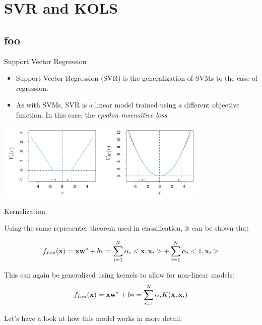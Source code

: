 \documentclass[serif,xcolor=pdftex,dvipsnames,table,hyperref={bookmarks=false,breaklinks}]{beamer}
\begin{document}
\maketitlepage

\section{SVR and KOLS}
\subsection{foo}

\begin{frame}[t]{Support Vector Regression}

\begin{itemize}
\item Support Vector Regression (SVR) is the generalization of SVMs to the case of regression.

\pause \item As with SVMs, SVR is a linear model trained using a different 
objective function. In this case, the \textit{epsilon insensitive loss}.
\end{itemize}
\pause
\center
\includegraphics[width=4in]{../Figures/svr_loss.png}

\end{frame}


\begin{frame}[t]{Kernelization}

Using the same representer theorem used in classification, it can be shown that

$$f_{Lin}({\mathbf{x}}) = {\mathbf{x}}{\mathbf{w}}^*+b* = \sum_{i=1}^N \alpha_i<{\mathbf{x}},{\mathbf{x}}_i> + \sum_{i=1}^N \alpha_i<1,{\mathbf{x}}_i>$$

\pause This can again be generalized using kernels to allow for non-linear models:
$$f_{Lin}({\mathbf{x}}) = {\mathbf{x}}{\mathbf{w}}^*+b* = \sum_{i=1}^N \alpha_iK({\mathbf{x}},{\mathbf{x}}_i)$$

\pause Let's have a look at how this model works in more detail.

\end{frame}
\end{document}

